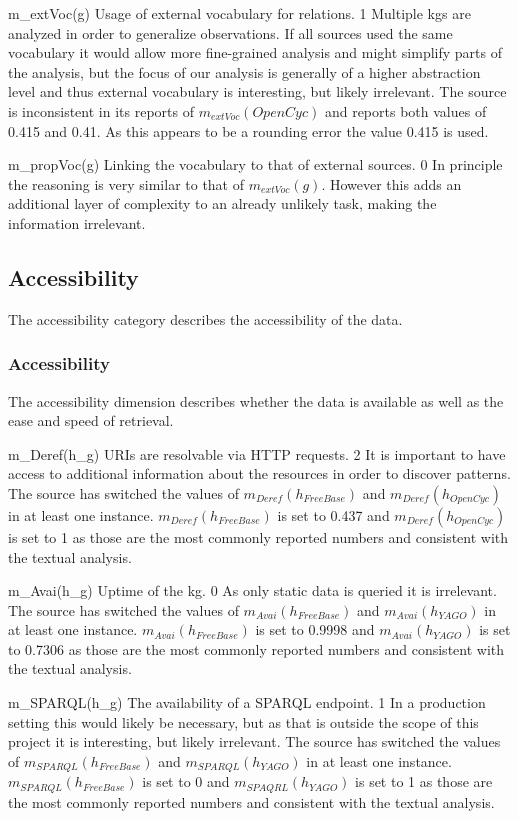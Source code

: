 \weighttable
{m_{extVoc}(g)}
{Usage of external vocabulary for relations.}
{1}
{Multiple \glspl{kg} are analyzed in order to generalize observations. If all sources used the same vocabulary it would allow more fine-grained analysis and might simplify parts of the analysis, but the focus of our analysis is generally of a higher abstraction level and thus external vocabulary is interesting, but likely irrelevant.}
{The source is inconsistent in its reports of $m_{extVoc}(OpenCyc)$ and reports both values of 0.415 and 0.41. As this appears to be a rounding error the value 0.415 is used.}

\weighttable
{m_{propVoc}(g)}
{Linking the vocabulary to that of external sources.}
{0}
{In principle the reasoning is very similar to that of $m_{extVoc}(g)$. However this adds an additional layer of complexity to an already unlikely task, making the information irrelevant.}
{}

\subsection{Accessibility}
The accessibility category describes the accessibility of the data.

\subsubsection{Accessibility}
The accessibility dimension describes whether the data is available as well as the ease and speed of retrieval.

\weighttable
{m_{Deref}(h_g)}
{URIs are resolvable via HTTP requests.}
{2}
{It is important to have access to additional information about the resources in order to discover patterns.}
{The source has switched the values of $m_{Deref}(h_{FreeBase})$ and $m_{Deref}(h_{OpenCyc})$ in at least one instance. $m_{Deref}(h_{FreeBase})$ is set to 0.437 and $m_{Deref}(h_{OpenCyc})$ is set to 1 as those are the most commonly reported numbers and consistent with the textual analysis.}

\weighttable
{m_{Avai}(h_g)}
{Uptime of the \gls{kg}.}
{0}
{As only static data is queried it is irrelevant.}
{The source has switched the values of $m_{Avai}(h_{FreeBase})$ and $m_{Avai}(h_{YAGO})$ in at least one instance. $m_{Avai}(h_{FreeBase})$ is set to 0.9998 and $m_{Avai}(h_{YAGO})$ is set to 0.7306 as those are the most commonly reported numbers and consistent with the textual analysis.}

\weighttable
{m_{SPARQL}(h_g)}
{The availability of a SPARQL endpoint.}
{1}
{In a production setting this would likely be necessary, but as that is outside the scope of this project it is interesting, but likely irrelevant.}
{The source has switched the values of $m_{SPARQL}(h_{FreeBase})$ and $m_{SPARQL}(h_{YAGO})$ in at least one instance. $m_{SPARQL}(h_{FreeBase})$ is set to 0 and $m_{SPAQRL}(h_{YAGO})$ is set to 1 as those are the most commonly reported numbers and consistent with the textual analysis.}

